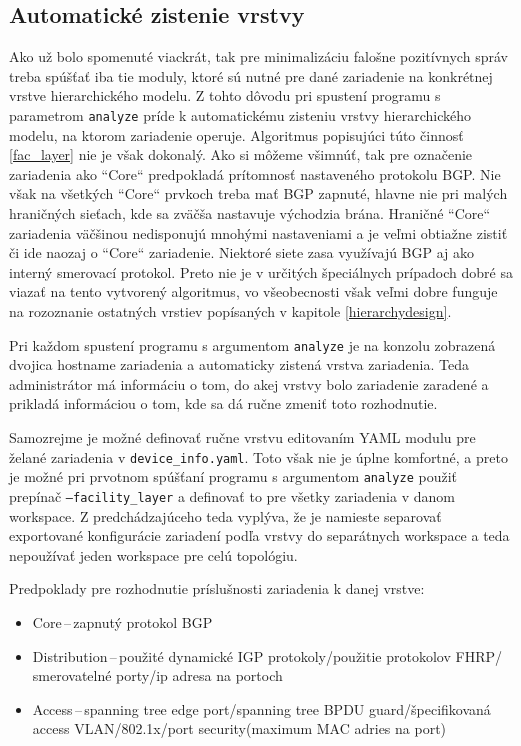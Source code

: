 \newpage
\subsection{Automatické zistenie vrstvy}
\label{automatic_faclayer}

Ako už bolo spomenuté viackrát, tak pre minimalizáciu falošne pozitívnych správ treba spúšťať iba tie moduly, ktoré sú nutné pre dané zariadenie na konkrétnej vrstve hierarchického modelu. Z tohto dôvodu pri spustení programu s parametrom \texttt{analyze} príde k automatickému zisteniu vrstvy hierarchického modelu, na ktorom zariadenie operuje. Algoritmus popisujúci túto činnosť \ref{fac_layer} nie je však dokonalý. Ako si môžeme všimnúť, tak pre označenie zariadenia ako ``Core`` predpokladá prítomnosť nastaveného protokolu BGP. Nie však na všetkých ``Core`` prvkoch treba mať BGP zapnuté, hlavne nie pri malých hraničných sieťach, kde sa zväčša nastavuje východzia brána. Hraničné ``Core`` zariadenia väčšinou nedisponujú mnohými nastaveniami a je veľmi obtiažne zistiť či ide naozaj o ``Core`` zariadenie. Niektoré siete zasa využívajú BGP aj ako interný smerovací protokol. Preto nie je v určitých špeciálnych prípadoch dobré sa viazať na tento vytvorený algoritmus, vo všeobecnosti však veľmi dobre funguje na rozoznanie ostatných vrstiev popísaných v kapitole \ref{hierarchydesign}.

Pri každom spustení programu s argumentom \texttt{analyze} je na konzolu zobrazená dvojica hostname zariadenia a automaticky zistená vrstva zariadenia. Teda administrátor má informáciu o tom, do akej vrstvy bolo zariadenie zaradené a prikladá informáciou o tom, kde sa dá ručne zmeniť toto rozhodnutie. 

Samozrejme je možné definovať ručne vrstvu editovaním YAML modulu pre želané zariadenia v \texttt{device\_info.yaml}. Toto však nie je úplne komfortné, a preto je možné pri prvotnom spúšťaní programu s argumentom \texttt{analyze} použiť prepínač \texttt{--facility\_layer} a definovať to pre všetky zariadenia v danom workspace. Z predchádzajúceho teda vyplýva, že je namieste separovať exportované konfigurácie zariadení podľa vrstvy do separátnych workspace a teda nepoužívať jeden workspace pre celú topológiu.  

\vspace{2em}
\noindent
Predpoklady pre rozhodnutie príslušnosti zariadenia k danej vrstve:
\begin{itemize}
	\item Core\,--\,zapnutý protokol BGP
	\item Distribution\,--\,použité dynamické IGP protokoly/použitie protokolov FHRP/ smerovatelné porty/ip adresa na portoch
	\item Access\,--\,spanning tree edge port/spanning tree BPDU guard/špecifikovaná access VLAN/802.1x/port security(maximum MAC adries na port) 
\end{itemize}

